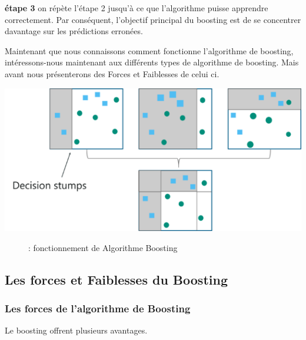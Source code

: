 \documentclass[french,a4paper,12pt]{article}
\begin{document}
 
 \textbf{étape 3}
\quad on répète l'étape 2 jusqu'à ce que l'algorithme puisse apprendre correctement.
Par conséquent, l'objectif principal du boosting est de se concentrer davantage sur les prédictions erronées.

\quad Maintenant que nous connaissons comment fonctionne l’algorithme de boosting, intéressons-nous maintenant aux différents types de algorithme de boosting. Mais avant nous présenterons des Forces  et Faiblesses de celui ci.


\begin{center}
\includegraphics[scale=1]{fonctionnement boosting.png}
\begin{figure}[h]
\caption{: fonctionnement de Algorithme Boosting}
\end{figure}
\end{center}
\subsection{Les forces et Faiblesses du Boosting}
\subsubsection{ Les forces de l'algorithme de Boosting}

\quad Le boosting offrent plusieurs avantages.
\end{document}
